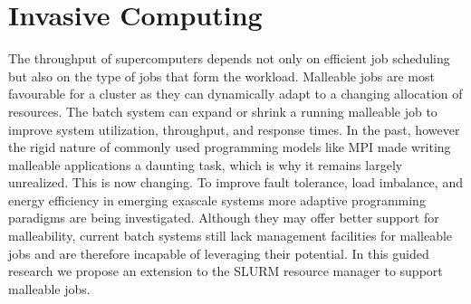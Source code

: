 \documentclass[a4paper, 12pt]{article}
\begin{document}
\section{Invasive Computing}
The throughput of supercomputers depends not only on efficient job scheduling but also on the type of jobs that form the workload. Malleable jobs are most favourable for a cluster as they can dynamically adapt to a changing allocation of resources. The batch system can expand or shrink a running malleable job to improve system utilization, throughput, and response times. In the past, however the rigid nature of commonly used programming models like MPI made writing malleable applications a daunting task, which is why it remains largely unrealized. This is now changing. To improve fault tolerance, load imbalance, and energy efficiency in emerging exascale systems more adaptive programming paradigms are being investigated. Although they may offer better support for malleability, current batch systems still lack management facilities for malleable jobs and are therefore incapable of leveraging their potential. In this guided research we propose an extension to the SLURM resource manager to support malleable jobs.
\end{document}
